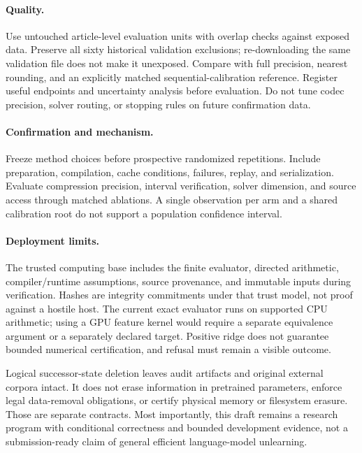 \documentclass[10pt,twocolumn,letterpaper]{article}
\begin{document}
\paragraph{Quality.}
Use untouched article-level evaluation units with overlap checks against exposed
data. Preserve all sixty historical validation exclusions; re-downloading the
same validation file does not make it unexposed. Compare with full precision,
nearest rounding, and an explicitly matched sequential-calibration reference.
Register useful endpoints and uncertainty analysis before evaluation. Do not tune
codec precision, solver routing, or stopping rules on future confirmation data.

\paragraph{Confirmation and mechanism.}
Freeze method choices before prospective randomized repetitions. Include
preparation, compilation, cache conditions, failures, replay, and serialization.
Evaluate compression precision, interval verification, solver dimension, and
source access through matched ablations. A single observation per arm and a
shared calibration root do not support a population confidence interval.

\paragraph{Deployment limits.}
The trusted computing base includes the finite evaluator, directed arithmetic,
compiler/runtime assumptions, source provenance, and immutable inputs during
verification. Hashes are integrity commitments under that trust model, not proof
against a hostile host. The current exact evaluator runs on supported CPU
arithmetic; using a GPU feature kernel would require a separate equivalence
argument or a separately declared target. Positive ridge does not guarantee
bounded numerical certification, and refusal must remain a visible outcome.

Logical successor-state deletion leaves audit artifacts and original external
corpora intact. It does not erase information in pretrained parameters, enforce
legal data-removal obligations, or certify physical memory or filesystem erasure.
Those are separate contracts. Most importantly, this draft remains a research
program with conditional correctness and bounded development evidence, not a
submission-ready claim of general efficient language-model unlearning.
\end{document}
